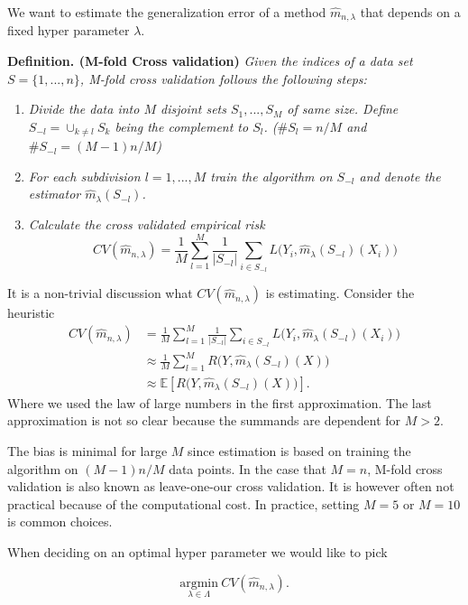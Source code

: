 \documentclass[a4paper,10pt,openany]{book}
\providecommand{\tightlist}{%
 \setlength{\itemsep}{0pt}\setlength{\parskip}{0pt}}
\begin{document}
We want to estimate the generalization error of a method \(\hat{m}_{n,\lambda}\) that depends on a fixed hyper parameter \(\lambda\).

\textbf{Definition. (M-fold Cross validation)} \emph{Given the indices of a data set \(S=\{1,...,n\}\), M-fold cross validation follows the following steps:}

\begin{enumerate}
\def\labelenumi{\arabic{enumi}.}
\tightlist
\item
  \emph{Divide the data into \(M\) disjoint sets \(S_1,...,S_M\) of same size. Define \(S_{-l}=\cup_{k\ne l}S_k\) being the complement to \(S_l\). (\(\#S_l=n/M\) and \(\#S_{-l}=(M-1)n/M\))}
\item
  \emph{For each subdivision \(l=1,...,M\) train the algorithm on \(S_{-l}\) and denote the estimator \(\hat{m}_\lambda(S_{-l})\).}
\item
  \emph{Calculate the cross validated empirical risk}
  \[
    CV(\hat{m}_{n,\lambda})=\frac{1}{M}\sum_{l=1}^M\frac{1}{\vert S_{-l}\vert}\sum_{i\in S_{-l}}L\big(Y_i,\hat{m}_\lambda(S_{-l})(X_i)\big)
    \]
\end{enumerate}

It is a non-trivial discussion what \(CV(\hat{m}_{n,\lambda})\) is estimating. Consider the heuristic
\begin{align*}
CV(\hat{m}_{n,\lambda})&=\frac{1}{M}\sum_{l=1}^M\frac{1}{\vert S_{-l}\vert}\sum_{i\in S_{-l}}L\big(Y_i,\hat{m}_\lambda(S_{-l})(X_i)\big)\\
&\approx \frac{1}{M}\sum_{l=1}^MR\big(Y,\hat{m}_\lambda(S_{-l})(X)\big)\\
&\approx \mathbb{E}\left[R\big(Y,\hat{m}_\lambda(S_{-l})(X)\big)\right].
\end{align*}
Where we used the law of large numbers in the first approximation. The last approximation is not so clear because the summands are dependent for \(M>2\).

The bias is minimal for large \(M\) since estimation is based on training the algorithm on \((M-1)n/M\) data points. In the case that \(M=n\), M-fold cross validation is also known as leave-one-our cross validation. It is however often not practical because of the computational cost. In practice, setting \(M=5\) or \(M=10\) is common choices.

When deciding on an optimal hyper parameter we would like to pick

\[
\underset{\lambda \in \Lambda}{\text{argmin}}\ CV(\hat{m}_{n,\lambda}).
\]
\end{document}
